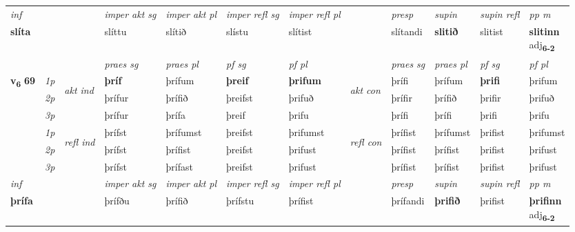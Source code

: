 \begin{longtable}[l]{X>{\footnotesize\itshape}llXXXXlXXXX}
   {\textit{inf}} & &  & \textit{imper akt sg} & \textit{imper akt pl} & \textit{imper refl sg} & \textit{imper refl pl} && \textit{presp} & \textit{supin} & \textit{supin refl} & \textit{pp m} \\*
  {\textbf{slíta}} & && slíttu  & slítið & slístu & slítist && slítandi &  \textbf{slitið} & slitist & \specialcell{\textbf{slitinn} \\ adj\textbf{\textsubscript{6-2}}} \\*

\midrule

 & &   & \textit{praes sg}  & \textit{praes pl}    & \textit{ pf sg} & \textit{pf pl} & & \textit{praes sg}  & \textit{praes pl}    & \textit{pf sg} & \textit{pf pl }  \\ \cmidrule{4-7} \cmidrule{9-12}
 \multirow{2}{*}{{{\textbf{v{\textsubscript{6}}} \Large{\textbf{69}}}}}  & 1p & \multirow{3}{*}{\begin{turn}{90}\textit{akt ind}\end{turn}} & \textbf{þríf} & þrífum & \textbf{þreif} & \textbf{þrifum} & \multirow{3}{*}{\begin{turn}{90}\textit{akt con}\end{turn}} &þrífi & þrífum & \textbf{þrifi} & þrifum\\*
 & 2p &  &  þrífur  & þrífið & þreifst & þrifuð & & þrífir & þrífið & þrifir & þrifuð \\*
 & 3p &  & þrífur & þrífa & þreif & þrifu & & þrífi & þrífi& þrifi & þrifu \\*
\cmidrule{4-7} \cmidrule{9-12}
 & 1p & \multirow{3}{*}{\begin{turn}{90}\textit{refl ind}\end{turn}}  & þrífst & þrífumst & þreifst & þrifumst & \multirow{3}{*}{\begin{turn}{90}\textit{refl con}\end{turn}}  &þrífist & þrífumst & þrifist & þrifumst \\*
 & 2p &  & þrífst & þrífist & þreifst & þrifust & &þrífist & þrífist & þrifist & þrifust \\*
 & 3p  & & þrífst & þrífast & þreifst & þrifust & & þrífist & þrífist& þrifist & þrifust \\*
\cmidrule{4-7} \cmidrule{9-12}

   {\textit{inf}} & &  & \textit{imper akt sg} & \textit{imper akt pl} & \textit{imper refl sg} & \textit{imper refl pl} && \textit{presp} & \textit{supin} & \textit{supin refl} & \textit{pp m} \\*
  {\textbf{þrífa}} & && þrífðu  & þrífið & þrífstu & þrífist && þrífandi &  \textbf{þrifið} & þrifist & \specialcell{\textbf{þrifinn} \\ adj\textbf{\textsubscript{6-2}}} \\*


\end{longtable}
